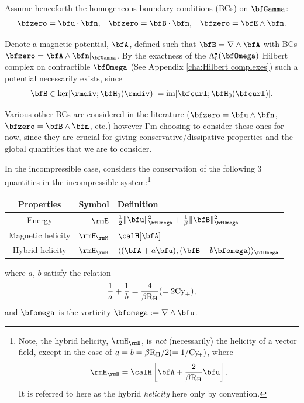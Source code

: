     Assume henceforth the homogeneous boundary conditions (BCs) on $\bfGamma$:
    \begin{align}\label{eqn:canonical boundary conditions}
        \bfzero  =  \bfu\cdot\bfn,   &&
        \bfzero  =  \bfB\cdot\bfn,   &&
        \bfzero  =  \bfE\wedge\bfn.
    \end{align}

    Denote a magnetic potential, $\bfA$, defined such that $\bfB  =  \nabla\wedge\bfA$ with BCs $\bfzero  =  \bfA\wedge\bfn|_{\bfGamma}$. By the exactness of the $\Lambda_{0}^{\bullet}(\bfOmega)$ Hilbert complex on contractible $\bfOmega$ (See Appendix \ref{cha:Hilbert complexes}) such a potential necessarily exists, since
    \begin{equation}
        \bfB  \in  \ker[\rmdiv; \bfH_{0}(\rmdiv)]  =  \im[\bfcurl; \bfH_{0}(\bfcurl)].
    \end{equation}

    \begin{remark}
        Various other BCs are considered in the literature ($\bfzero = \bfu\wedge\bfn$, $\bfzero = \bfB\wedge\bfn$, etc.) however I'm choosing to consider these ones for now, since they are crucial for giving conservative/dissipative properties and the global quantities that we are to consider.
    \end{remark}

    In the incompressible case, \cite{Laakmann_Hu_Farrell_2022} considers the conservation of the following 3 quantities in the incompressible system:\footnote{Note, the hybrid helicity, $\rmH_{\rmH}$, is \emph{not} (necessarily) the helicity of a vector field, except in the case of $a = b = \beta\mathrm{R}_{\mathrm{H}}/2 (= 1/\mathrm{Cy}\!_{+})$, where
    \begin{equation}
        \rmH_{\rmH} = \calH\left[\bfA + \frac{2}{\beta\rmRH}\bfu\right].
    \end{equation}
    It is referred to here as the hybrid \emph{helicity} here only by convention.}
    \begin{center}\begin{tabular}{ c | r : l }
        Properties  &  Symbol  &  Definition  \\
        \hline\hline
        Energy  &  $\rmE$  &  $\frac{1}{2}\|\bfu\|_{\bfOmega}^{2} + \frac{1}{\beta}\|\bfB\|_{\bfOmega}^{2}$  \\
        \hdashline
        Magnetic helicity \cite{Blackman_2015}  &  $\rmH_{\rmM}$  &  $\calH[\bfA]$  \\
        Hybrid helicity \cite{Subramanian_Brandenburg_2006}  &  $\rmH_{\rmH}$  &  $\langle(\bfA + a\bfu), (\bfB + b\bfomega)\rangle_{\bfOmega}$
    \end{tabular}\end{center}
    where $a$, $b$ satisfy the relation
    \begin{equation}
        \frac{1}{a} + \frac{1}{b}  =  \frac{4}{\beta\mathrm{R}_{\mathrm{H}}}  (=  2\mathrm{Cy}_{+}),
    \end{equation}
    and $\bfomega$ is the vorticity $\bfomega  :=  \nabla\wedge\bfu$.
    
